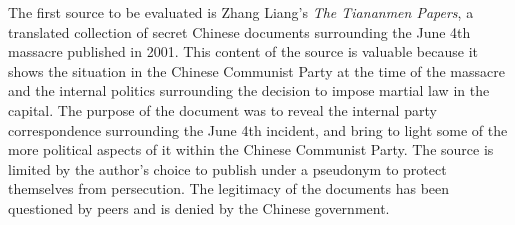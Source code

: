 \documentclass[../main.tex]{subfiles}
\begin{document}
The first source to be evaluated is Zhang Liang’s \textit{The Tiananmen Papers}, a translated collection of secret Chinese documents surrounding the June 4th massacre published in 2001. This content of the source is valuable because it shows the situation in the Chinese Communist Party at the time of the massacre and the internal politics surrounding the decision to impose martial law in the capital. The purpose of the document was to reveal the internal party correspondence surrounding the June 4th incident, and bring to light some of the more political aspects of it within the Chinese Communist Party. The source is limited by the author’s choice to publish under a pseudonym to protect themselves from persecution. The legitimacy of the documents has been questioned by peers and is denied by the Chinese government.
\end{document}
